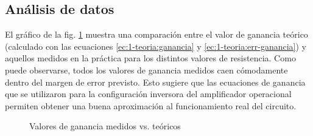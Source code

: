 \subsection{Análisis de datos}

El gráfico de la fig. \ref{fig:1-analisis:ganancia} muestra una comparación
entre el valor de ganancia teórico (calculado con las ecuaciones 
\ref{ec:1-teoria:ganancia} y \ref{ec:1-teoria:err-ganancia}) y aquellos 
medidos en la práctica para los distintos valores de resistencia. Como puede
observarse, todos los valores de ganancia medidos caen cómodamente dentro
del margen de error previsto. Esto sugiere que las ecuaciones de ganancia
que se utilizaron para la configuración inversora del amplificador operacional
permiten obtener una buena aproximación al funcionamiento real del circuito.

\begin{figure}[H]
    \centering
    
    \caption{Valores de ganancia medidos vs. teóricos}
    \label{fig:1-analisis:ganancia}
\end{figure}

